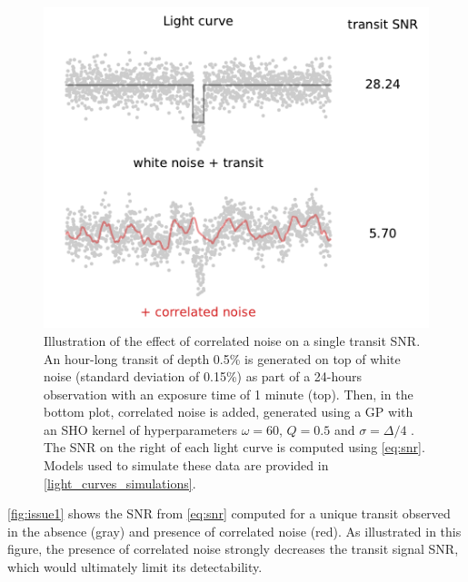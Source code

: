 \documentclass[modern]{aastex631}
\begin{document}
\begin{figure}[H]
    \begin{centering}
        \includegraphics[width=0.6\linewidth]{./issue1.pdf}
        \caption{Illustration of the effect of correlated noise on a single transit SNR. An hour-long transit of depth 0.5\% is generated on top of white noise (standard deviation of 0.15\%) as part of a 24-hours observation with an exposure time of 1 minute (top). Then, in the bottom plot, correlated noise is added, generated using a GP with an SHO kernel of hyperparameters $\omega=60$, $Q=0.5$ and $\sigma=\Delta/4$ . The SNR on the right of each light curve is computed using \autoref{eq:snr}. Models used to simulate these data are provided in \autoref{light_curves_simulations}. }
        \label{fig:issue1}
    \end{centering}
\end{figure}
\autoref{fig:issue1} shows the SNR from \autoref{eq:snr} computed for a unique transit observed in the absence (gray) and presence of correlated noise (red). As illustrated in this figure, the presence of correlated noise strongly decreases the transit signal SNR, which would ultimately limit its detectability.
\end{document}
